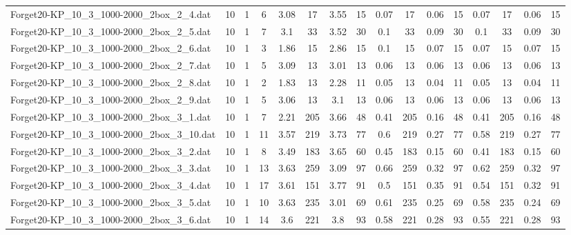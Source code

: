 \begin{sidewaystable}[!ht]
{\begin{tabular}{lccccccccccccccc}
Forget20-KP\_10\_3\_1000-2000\_2box\_2\_4.dat & 10 & 1 & 6 & 3.08 & 17 & 3.55 & 15 & 0.07 & 17 &  \textcolor{blue2}{0.06} & 15 & 0.07 & 17 &  \textcolor{blue2}{0.06} & 15 \\
Forget20-KP\_10\_3\_1000-2000\_2box\_2\_5.dat & 10 & 1 & 7 & 3.1 & 33 & 3.52 & 30 & 0.1 & 33 &  \textcolor{blue2}{0.09} & 30 & 0.1 & 33 &  \textcolor{blue2}{0.09} & 30 \\
Forget20-KP\_10\_3\_1000-2000\_2box\_2\_6.dat & 10 & 1 & 3 & 1.86 & 15 & 2.86 & 15 & 0.1 & 15 &  \textcolor{blue2}{0.07} & 15 &  \textcolor{blue2}{0.07} & 15 &  \textcolor{blue2}{0.07} & 15 \\
Forget20-KP\_10\_3\_1000-2000\_2box\_2\_7.dat & 10 & 1 & 5 & 3.09 & 13 & 3.01 & 13 & 0.06 & 13 & 0.06 & 13 & 0.06 & 13 & 0.06 & 13 \\
Forget20-KP\_10\_3\_1000-2000\_2box\_2\_8.dat & 10 & 1 & 2 & 1.83 & 13 & 2.28 & 11 & 0.05 & 13 &  \textcolor{blue2}{0.04} & 11 & 0.05 & 13 &  \textcolor{blue2}{0.04} & 11 \\
Forget20-KP\_10\_3\_1000-2000\_2box\_2\_9.dat & 10 & 1 & 5 & 3.06 & 13 & 3.1 & 13 &  \textcolor{blue2}{0.06} & 13 &  \textcolor{blue2}{0.06} & 13 &  \textcolor{blue2}{0.06} & 13 &  \textcolor{blue2}{0.06} & 13 \\
Forget20-KP\_10\_3\_1000-2000\_2box\_3\_1.dat & 10 & 1 & 7 & 2.21 & 205 & 3.66 & 48 & 0.41 & 205 &  \textcolor{blue2}{0.16} & 48 & 0.41 & 205 &  \textcolor{blue2}{0.16} & 48 \\
Forget20-KP\_10\_3\_1000-2000\_2box\_3\_10.dat & 10 & 1 & 11 & 3.57 & 219 & 3.73 & 77 & 0.6 & 219 &  \textcolor{blue2}{0.27} & 77 & 0.58 & 219 &  \textcolor{blue2}{0.27} & 77 \\
Forget20-KP\_10\_3\_1000-2000\_2box\_3\_2.dat & 10 & 1 & 8 & 3.49 & 183 & 3.65 & 60 & 0.45 & 183 &  \textcolor{blue2}{0.15} & 60 & 0.41 & 183 &  \textcolor{blue2}{0.15} & 60 \\
Forget20-KP\_10\_3\_1000-2000\_2box\_3\_3.dat & 10 & 1 & 13 & 3.63 & 259 & 3.09 & 97 & 0.66 & 259 &  \textcolor{blue2}{0.32} & 97 & 0.62 & 259 &  \textcolor{blue2}{0.32} & 97 \\
Forget20-KP\_10\_3\_1000-2000\_2box\_3\_4.dat & 10 & 1 & 17 & 3.61 & 151 & 3.77 & 91 & 0.5 & 151 & 0.35 & 91 & 0.54 & 151 &  \textcolor{blue2}{0.32} & 91 \\
Forget20-KP\_10\_3\_1000-2000\_2box\_3\_5.dat & 10 & 1 & 10 & 3.63 & 235 & 3.01 & 69 & 0.61 & 235 & 0.25 & 69 & 0.58 & 235 &  \textcolor{blue2}{0.24} & 69 \\
Forget20-KP\_10\_3\_1000-2000\_2box\_3\_6.dat & 10 & 1 & 14 & 3.6 & 221 & 3.8 & 93 & 0.58 & 221 & 0.28 & 93 & 0.55 & 221 & 0.28 & 93 \\

\end{tabular}}
\end{sidewaystable}
